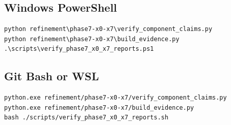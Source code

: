 \documentclass[11pt]{article}
\begin{document}
\subsection{Windows PowerShell}

\begin{Verbatim}[fontsize=\small]
python refinement\phase7-x0-x7\verify_component_claims.py
python refinement\phase7-x0-x7\build_evidence.py
.\scripts\verify_phase7_x0_x7_reports.ps1
\end{Verbatim}

\subsection{Git Bash or WSL}

\begin{Verbatim}[fontsize=\small]
python.exe refinement/phase7-x0-x7/verify_component_claims.py
python.exe refinement/phase7-x0-x7/build_evidence.py
bash ./scripts/verify_phase7_x0_x7_reports.sh
\end{Verbatim}
\end{document}
